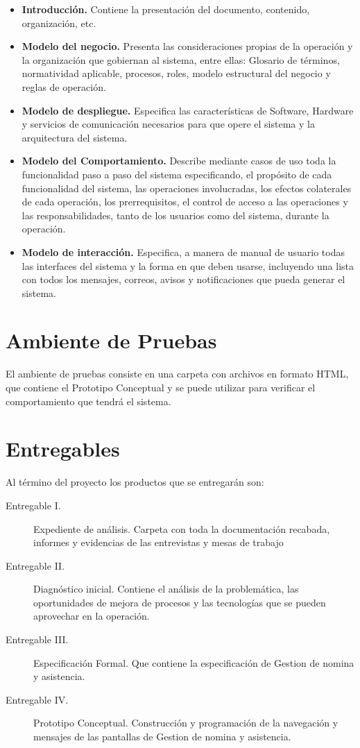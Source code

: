 \documentclass[10pt]{book}
\newcommand{\nombreProyecto}{Gestion de nomina y asistencia}
\begin{document}
\begin{itemize}
	\item {\bf Introducción.} Contiene la presentación del documento, contenido, organización, etc.
	\item {\bf Modelo del negocio.} Presenta las consideraciones propias de la operación y la organización que gobiernan al sistema, entre ellas: Glosario de términos, normatividad aplicable, procesos, roles, modelo estructural del negocio y reglas de operación.
	\item {\bf Modelo de despliegue.} Especifica las características de Software, Hardware y servicios de comunicación necesarios para que opere el sistema y la arquitectura del sistema.
	\item {\bf Modelo del Comportamiento.} Describe mediante casos de uso toda la funcionalidad paso a paso del sistema especificando, el propósito de cada funcionalidad del sistema, las operaciones involucradas, los efectos colaterales de cada operación, los prerrequisitos, el control de acceso a las operaciones y las responsabilidades, tanto de los usuarios como del sistema, durante la operación.
	\item {\bf Modelo de interacción.} Especifica, a manera de manual de usuario todas las interfaces del sistema y la forma en que deben usarse, incluyendo una lista con todos los mensajes, correos, avisos y notificaciones que pueda generar el sistema.
\end{itemize}


\section{Ambiente de Pruebas}

	El ambiente de pruebas consiste en una carpeta con archivos en formato HTML, que contiene el Prototipo Conceptual y se puede utilizar para verificar el comportamiento que tendrá el sistema.

\section{Entregables}
	
	Al término del proyecto los productos que se entregarán son:
	
\begin{description}
	\item [Entregable I.] Expediente de análisis. Carpeta con toda la documentación recabada, informes y evidencias de las entrevistas y mesas de trabajo
	\item [Entregable II.] Diagnóstico inicial. Contiene el análisis de la problemática, las oportunidades de mejora de procesos y las tecnologías que se pueden aprovechar en la operación.
	\item [Entregable III.] Especificación Formal. Que contiene la especificación de \nombreProyecto.
	\item [Entregable IV.] Prototipo Conceptual. Construcción y programación de la navegación y mensajes de las pantallas de \nombreProyecto.
\end{description}
\end{document}
